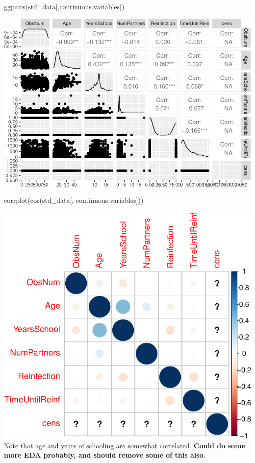 \documentclass[
]{article}
\newenvironment{Shaded}{\begin{snugshade}}{\end{snugshade}}
\newcommand{\FunctionTok}[1]{\textcolor[rgb]{0.00,0.00,0.00}{#1}}
\newcommand{\NormalTok}[1]{#1}
\begin{document}
\begin{Shaded}
\begin{Highlighting}[]
\FunctionTok{ggpairs}\NormalTok{(std\_data[,continuous.variables])}
\end{Highlighting}
\end{Shaded}

\includegraphics{practical_files/figure-latex/unnamed-chunk-5-1.pdf}

\begin{Shaded}
\begin{Highlighting}[]
\FunctionTok{corrplot}\NormalTok{(}\FunctionTok{cor}\NormalTok{(std\_data[, continuous.variables]))}
\end{Highlighting}
\end{Shaded}

\includegraphics{practical_files/figure-latex/unnamed-chunk-5-2.pdf}
Note that age and years of schooling are somewhat correlated. \textbf{Could do some more EDA probably, and should remove some of this also.}
\end{document}
